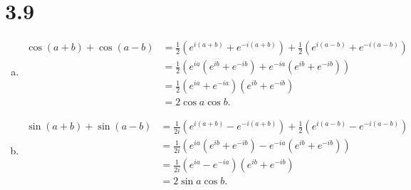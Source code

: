 \documentclass[12pt]{mypackage}
\begin{document}
\section{3.9}%
\begin{enumerate}[(a)]
  \item
    \begin{align*}
      \cos\left(a+b\right) + \cos\left(a-b\right) &= \frac{1}{2}\left(e^{i\left(a+b\right)} + e^{-i\left(a+b\right)}\right) + \frac{1}{2}\left(e^{i\left(a-b\right)} + e^{-i\left(a-b\right)}\right)\\
                                                  &= \frac{1}{2}\left(e^{ia}\left(e^{ib} +e^{-ib}\right) + e^{-ia}\left(e^{ib} + e^{-ib}\right)\right)\\
                                                  &= \frac{1}{2}\left(e^{ia} + e^{-ia}\right)\left(e^{ib} + e^{-ib}\right)\\
                                                  &= 2\cos a \cos b.
    \end{align*}
  \item 
    \begin{align*}
      \sin\left(a+b\right) + \sin\left(a-b\right) &= \frac{1}{2i}\left(e^{i\left(a + b\right)} - e^{-i\left(a+b\right)}\right) + \frac{1}{2}\left(e^{i\left(a-b\right)} - e^{-i\left(a-b\right)}\right)\\
                                                  &= \frac{1}{2i}\left(e^{ia}\left(e^{ib} + e^{-ib}\right) - e^{-ia}\left(e^{ib} + e^{-ib}\right)\right)\\
                                                  &= \frac{1}{2i}\left(e^{ia} - e^{-ia}\right)\left(e^{ib} + e^{-ib}\right)\\
                                                  &= 2\sin a \cos b.
    \end{align*}
\end{enumerate}
\end{document}
